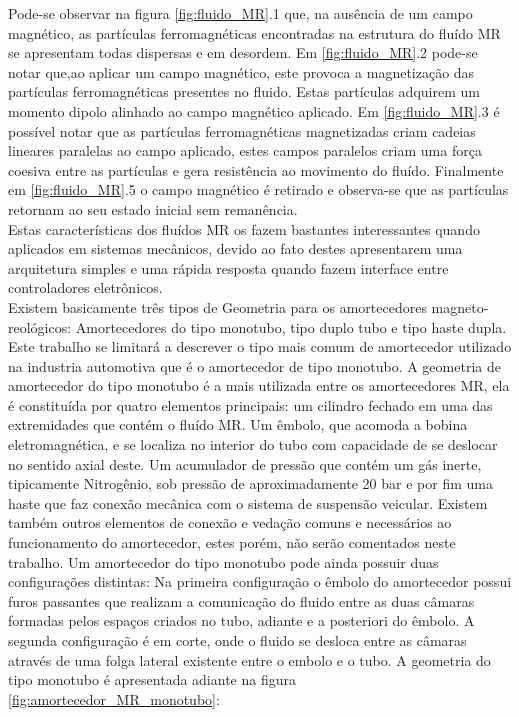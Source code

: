 \documentclass[a4paper]{ifacconf}
\begin{document}
    Pode-se observar na figura \ref{fig:fluido_MR}.1 que, na ausência de um campo magnético, as partículas ferromagnéticas encontradas na estrutura do fluído MR se apresentam todas dispersas e em desordem. Em \ref{fig:fluido_MR}.2 pode-se notar que,ao aplicar um campo magnético, este provoca a magnetização das partículas ferromagnéticas presentes no fluido. Estas partículas adquirem um momento dipolo alinhado ao campo magnético aplicado. Em \ref{fig:fluido_MR}.3 é possível notar que as partículas ferromagnéticas magnetizadas criam cadeias lineares paralelas ao campo aplicado, estes campos paralelos criam uma força coesiva entre as partículas e gera resistência ao movimento do fluído. Finalmente em \ref{fig:fluido_MR}.5 o campo magnético é retirado e observa-se que as partículas retornam ao seu estado inicial sem remanência. \\
    Estas características dos fluídos MR os fazem bastantes interessantes quando aplicados em sistemas mecânicos, devido ao fato destes apresentarem uma arquitetura simples e uma rápida resposta quando fazem interface entre controladores eletrônicos.\\
    Existem basicamente três tipos de Geometria para os amortecedores magneto-reológicos: Amortecedores do tipo monotubo, tipo duplo tubo e tipo haste dupla. Este trabalho se limitará a descrever o tipo mais comum de amortecedor utilizado na industria automotiva que é o amortecedor de tipo monotubo.
    A geometria de amortecedor do tipo monotubo é a mais utilizada entre os amortecedores MR, ela é constituída por quatro elementos principais: um cilindro fechado em uma das extremidades que contém o fluído MR. Um êmbolo, que acomoda a bobina eletromagnética, e se localiza no interior do tubo com capacidade de se deslocar no sentido axial deste. Um acumulador de pressão que contém um gás inerte, tipicamente Nitrogênio, sob pressão de aproximadamente 20 bar e por fim uma haste que faz conexão mecânica com o sistema de suspensão veicular. Existem também outros elementos de conexão e vedação comuns e necessários ao funcionamento do amortecedor, estes porém, não serão comentados neste trabalho. Um amortecedor do tipo monotubo pode ainda possuir duas configurações distintas: Na primeira configuração o êmbolo do amortecedor possui furos passantes que realizam a comunicação do fluido entre as duas câmaras formadas pelos espaços criados no tubo, adiante e a posteriori do êmbolo. A segunda configuração é em corte, onde o fluido se desloca entre as câmaras através de uma folga lateral existente entre o embolo e o tubo. A geometria do tipo monotubo é apresentada adiante na figura \ref{fig:amortecedor_MR_monotubo}:
    
\end{document}
